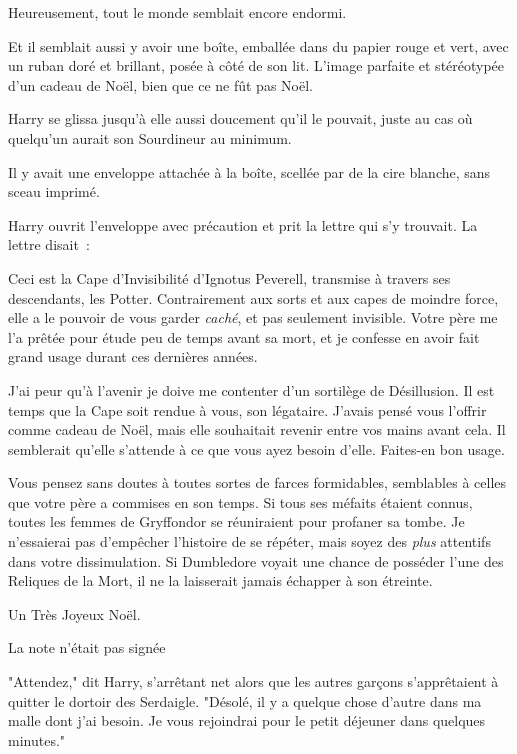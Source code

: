 Heureusement, tout le monde semblait encore endormi.

Et il semblait aussi y avoir une boîte, emballée dans du papier rouge et vert, avec un ruban doré et brillant, posée à côté de son lit. L'image parfaite et stéréotypée d'un cadeau de Noël, bien que ce ne fût pas Noël.

Harry se glissa jusqu'à elle aussi doucement qu'il le pouvait, juste au cas où quelqu'un aurait son Sourdineur au minimum.

Il y avait une enveloppe attachée à la boîte, scellée par de la cire blanche, sans sceau imprimé.

Harry ouvrit l'enveloppe avec précaution et prit la lettre qui s'y trouvait. La lettre disait~:
\begin{writtenNote}

Ceci est la Cape d'Invisibilité d'Ignotus Peverell, transmise à travers ses descendants, les Potter. Contrairement aux sorts et aux capes de moindre force, elle a le pouvoir de vous garder \emph{caché}, et pas seulement invisible. Votre père me l'a prêtée pour étude peu de temps avant sa mort, et je confesse en avoir fait grand usage durant ces dernières années.

J'ai peur qu'à l'avenir je doive me contenter d'un sortilège de Désillusion. Il est temps que la Cape soit rendue à vous, son légataire. J'avais pensé vous l'offrir comme cadeau de Noël, mais elle souhaitait revenir entre vos mains avant cela. Il semblerait qu'elle s'attende à ce que vous ayez besoin d'elle. Faites-en bon usage.

Vous pensez sans doutes à toutes sortes de farces formidables, semblables à celles que votre père a commises en son temps. Si tous ses méfaits étaient connus, toutes les femmes de Gryffondor se réuniraient pour profaner sa tombe. Je n'essaierai pas d'empêcher l'histoire de se répéter, mais soyez des \emph{plus} attentifs dans votre dissimulation. Si Dumbledore voyait une chance de posséder l'une des Reliques de la Mort, il ne la laisserait jamais échapper à son étreinte.

Un Très Joyeux Noël.

\end{writtenNote}

La note n'était pas signée

\later

"Attendez," dit Harry, s'arrêtant net alors que les autres garçons s'apprêtaient à quitter le dortoir des Serdaigle. "Désolé, il y a quelque chose d'autre dans ma malle dont j'ai besoin. Je vous rejoindrai pour le petit déjeuner dans quelques minutes."

